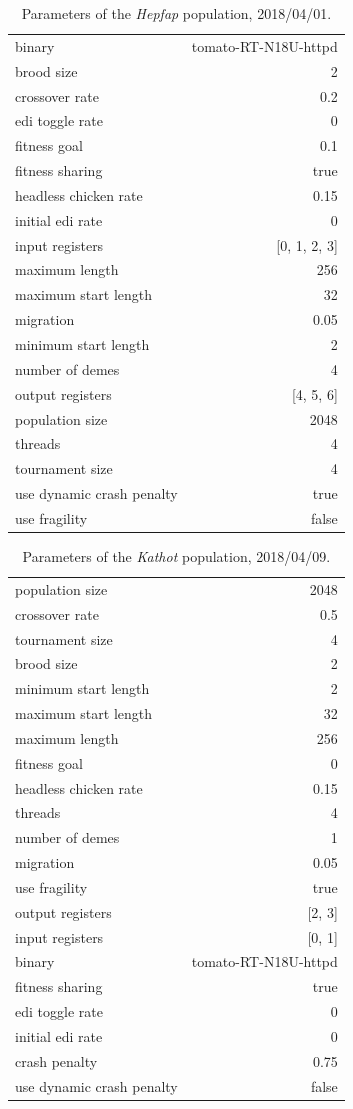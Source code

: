 \documentclass[12pt,glossary]{dalthesis}
\begin{document}
\begin{table}[htbp]
\caption{Parameters of the \emph{Hepfap} population, 2018/04/01.}
\centering
\begin{tabular}{lr}
binary & tomato-RT-N18U-httpd\\
brood size & 2\\
crossover rate & 0.2\\
edi toggle rate & 0\\
fitness goal & 0.1\\
fitness sharing & true\\
headless chicken rate & 0.15\\
initial edi rate & 0\\
input registers & [0, 1, 2, 3]\\
maximum length & 256\\
maximum start length & 32\\
migration & 0.05\\
minimum start length & 2\\
number of demes & 4\\
output registers & [4, 5, 6]\\
population size & 2048\\
threads & 4\\
tournament size & 4\\
use dynamic crash penalty & true\\
use fragility & false\\
\end{tabular}
\end{table}

\begin{table}[htbp]
\caption{Parameters of the \emph{Kathot} population, 2018/04/09.}
\centering
\begin{tabular}{lr}
population size & 2048\\
crossover rate & 0.5\\
tournament size & 4\\
brood size & 2\\
minimum start length & 2\\
maximum start length & 32\\
maximum length & 256\\
fitness goal & 0\\
headless chicken rate & 0.15\\
threads & 4\\
number of demes & 1\\
migration & 0.05\\
use fragility & true\\
output registers & [2, 3]\\
input registers & [0, 1]\\
binary & tomato-RT-N18U-httpd\\
fitness sharing & true\\
edi toggle rate & 0\\
initial edi rate & 0\\
crash penalty & 0.75\\
use dynamic crash penalty & false\\
\end{tabular}
\end{table}
\end{document}

